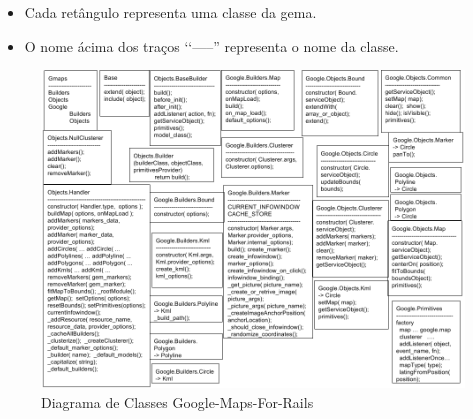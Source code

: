 \begin{itemize}

 \item Cada retângulo representa uma classe da gema.
 
 \item O nome ácima dos traços ‘‘-----'' representa o nome da classe.
 

 
\end{itemize}

\begin{figure}[ht]
  \begin{center}     
    \includegraphics[scale=0.35]{images/diagrama_de_classes_google_maps_for_rails.png}
    \caption{Diagrama de Classes Google-Maps-For-Rails}
    \label{fig:diagrama_de_classes_google_maps_for_rails}
  \end{center}
\end{figure}

